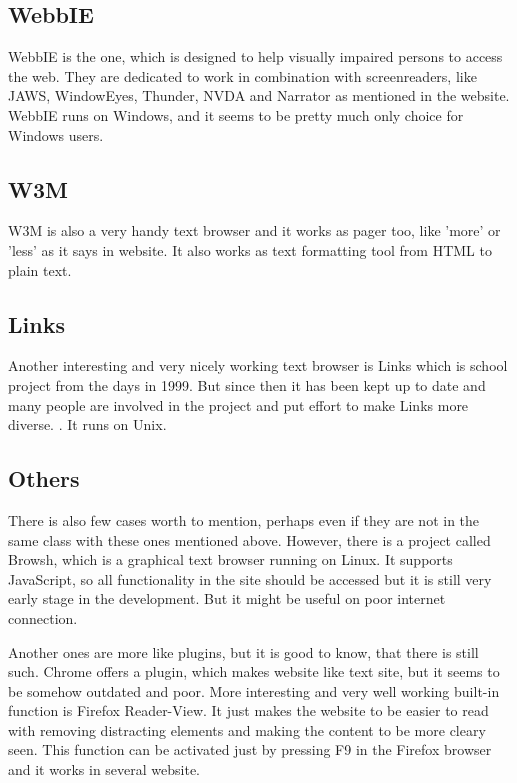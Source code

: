 \subsection{WebbIE}
\label{tb-webbie}
WebbIE is the one, which is designed to help visually impaired persons to access the web. They are dedicated to work in combination with screenreaders, like JAWS, WindowEyes, Thunder, NVDA and Narrator as mentioned in the \textcite{webbie-main} website. WebbIE runs on Windows, and it seems to be pretty much only choice for Windows users.

\subsection{W3M}
\label{tb-w3m}
W3M is also a very handy text browser and it works as pager too, like 'more' or 'less' as it says in \textcite{w3m} website. It also works as text formatting tool from HTML to plain text.

\subsection{Links}
\label{tb-links}
Another interesting and very nicely working text browser is Links which is school project from the days in 1999. But since then it has been kept up to date and many people are involved in the project and put effort to make Links more diverse. \parencite{links}. It runs on Unix.
\subsection{Others}
\label{tb-others}
There is also few cases worth to mention, perhaps even if they are not in the same class with these ones mentioned above. However, there is a project called Browsh, which is a graphical text browser running on Linux. It supports JavaScript, so all functionality in the site should be accessed but it is still very early stage in the development. But it might be useful on poor internet connection. 

Another ones are more like plugins, but it is good to know, that there is still such. Chrome offers a plugin, which makes website like text site, but it seems to be somehow outdated and poor. More interesting and very well working built-in function is Firefox Reader-View. It just makes the website to be easier to read with removing distracting elements and making the content to be more cleary seen. This function can be activated just by pressing F9 in the Firefox browser and it works in several website.


